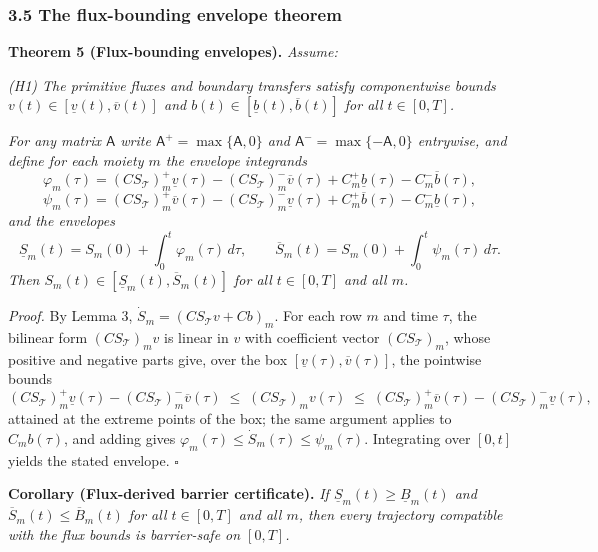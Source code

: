 \documentclass[11pt]{article}
\begin{document}
\subsubsection{3.5 The flux-bounding envelope
theorem}\label{the-flux-bounding-envelope-theorem}

\textbf{Theorem 5 (Flux-bounding envelopes).} \emph{Assume:}

\emph{(H1) The primitive fluxes and boundary transfers satisfy
componentwise bounds \(v(t) \in [\underline{v}(t), \overline{v}(t)]\)
and \(b(t) \in [\underline{b}(t), \overline{b}(t)]\) for all
\(t \in [0,T]\).}

\emph{For any matrix \(\mathsf{A}\) write
\(\mathsf{A}^{+} = \max\{\mathsf{A}, 0\}\) and
\(\mathsf{A}^{-} = \max\{-\mathsf{A}, 0\}\) entrywise, and define for
each moiety \(m\) the envelope integrands}
\[\varphi_m(\tau) = (C S_{\mathcal{T}})_{m}^{+} \underline{v}(\tau) - (C S_{\mathcal{T}})_{m}^{-} \overline{v}(\tau) + C_{m}^{+} \underline{b}(\tau) - C_{m}^{-} \overline{b}(\tau),\]
\[\psi_m(\tau) = (C S_{\mathcal{T}})_{m}^{+} \overline{v}(\tau) - (C S_{\mathcal{T}})_{m}^{-} \underline{v}(\tau) + C_{m}^{+} \overline{b}(\tau) - C_{m}^{-} \underline{b}(\tau),\]
\emph{and the envelopes}
\[\underline{S}_m(t) = S_m(0) + \int_0^t \varphi_m(\tau)\, d\tau, \qquad \overline{S}_m(t) = S_m(0) + \int_0^t \psi_m(\tau)\, d\tau.\]
\emph{Then \(S_m(t) \in [\underline{S}_m(t), \overline{S}_m(t)]\) for
all \(t \in [0,T]\) and all \(m\).}

\emph{Proof.} By Lemma 3, \(\dot S_m = (C S_{\mathcal{T}} v + Cb)_m\).
For each row \(m\) and time \(\tau\), the bilinear form
\((C S_{\mathcal{T}})_m v\) is linear in \(v\) with coefficient vector
\((C S_{\mathcal{T}})_m\), whose positive and negative parts give, over
the box \([\underline{v}(\tau), \overline{v}(\tau)]\), the pointwise
bounds
\[(C S_{\mathcal{T}})_{m}^{+} \underline{v}(\tau) - (C S_{\mathcal{T}})_{m}^{-} \overline{v}(\tau) \;\le\; (C S_{\mathcal{T}})_m v(\tau) \;\le\; (C S_{\mathcal{T}})_{m}^{+} \overline{v}(\tau) - (C S_{\mathcal{T}})_{m}^{-} \underline{v}(\tau),\]
attained at the extreme points of the box; the same argument applies to
\(C_m b(\tau)\), and adding gives
\(\varphi_m(\tau) \le \dot S_m(\tau) \le \psi_m(\tau)\). Integrating
over \([0,t]\) yields the stated envelope. \ensuremath{\square}

\textbf{Corollary (Flux-derived barrier certificate).} \emph{If
\(\underline{S}_m(t) \ge \underline{B}_m(t)\) and
\(\overline{S}_m(t) \le \overline{B}_m(t)\) for all \(t \in [0,T]\) and
all \(m\), then every trajectory compatible with the flux bounds is
barrier-safe on \([0,T]\).}
\end{document}
